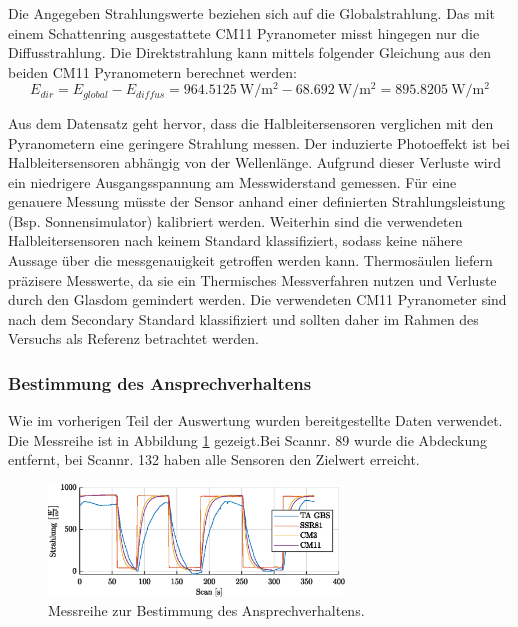 Die Angegeben Strahlungswerte beziehen sich auf die Globalstrahlung. Das mit einem Schattenring ausgestattete CM11 Pyranometer misst hingegen nur die Diffusstrahlung. Die Direktstrahlung kann mittels folgender Gleichung aus den beiden CM11 Pyranometern berechnet werden:
\begin{equation}
	\label{eq:Edir}
	E_{dir}=E_{global}-E_{diffus}=\SI{964.5125}{\watt\per\square\meter}-\SI{68.692}{\watt\per\square\meter} = \SI{895.8205}{\watt\per\square\meter}
\end{equation}

Aus dem Datensatz geht hervor, dass die Halbleitersensoren verglichen mit den Pyranometern eine geringere Strahlung messen. Der induzierte Photoeffekt ist bei Halbleitersensoren abhängig von der Wellenlänge. Aufgrund dieser Verluste wird ein niedrigere Ausgangsspannung am Messwiderstand gemessen. Für eine genauere Messung müsste der Sensor anhand einer definierten Strahlungsleistung (Bsp. Sonnensimulator) kalibriert werden. Weiterhin sind die verwendeten Halbleitersensoren nach keinem Standard klassifiziert, sodass keine nähere Aussage über die messgenauigkeit getroffen werden kann. Thermosäulen liefern präzisere Messwerte, da sie ein Thermisches Messverfahren nutzen und Verluste durch den Glasdom gemindert werden. Die verwendeten CM11 Pyranometer sind nach dem Secondary Standard klassifiziert und sollten daher im Rahmen des Versuchs als Referenz betrachtet werden.


\subsubsection{Bestimmung des Ansprechverhaltens}
Wie im vorherigen Teil der Auswertung wurden bereitgestellte Daten verwendet. Die Messreihe ist in Abbildung \ref{fig:response} gezeigt.Bei Scannr. 89 wurde die Abdeckung entfernt, bei Scannr. 132 haben alle Sensoren den Zielwert erreicht.
\begin{figure}[H]
	\centering
	\includegraphics[width=0.7\textwidth]{../DATA/Messreihe_Ansprechzeit.eps}
	\caption[Messreihe zur Bestimmung des Ansprechverhaltens.]{Messreihe zur Bestimmung des Ansprechverhaltens.}
	\label{fig:response}
\end{figure}


